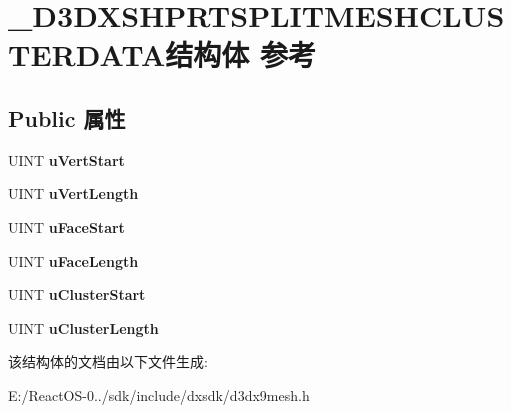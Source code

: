 \hypertarget{struct___d3_d_x_s_h_p_r_t_s_p_l_i_t_m_e_s_h_c_l_u_s_t_e_r_d_a_t_a}{}\section{\+\_\+\+D3\+D\+X\+S\+H\+P\+R\+T\+S\+P\+L\+I\+T\+M\+E\+S\+H\+C\+L\+U\+S\+T\+E\+R\+D\+A\+T\+A结构体 参考}
\label{struct___d3_d_x_s_h_p_r_t_s_p_l_i_t_m_e_s_h_c_l_u_s_t_e_r_d_a_t_a}
\subsection*{Public 属性}
\begin{DoxyCompactItemize}
\item 
\mbox{\label{struct___d3_d_x_s_h_p_r_t_s_p_l_i_t_m_e_s_h_c_l_u_s_t_e_r_d_a_t_a_a236d9789a21dc2db70242b1cb53d2841}} 
U\+I\+NT {\bfseries u\+Vert\+Start}
\item 
\mbox{\label{struct___d3_d_x_s_h_p_r_t_s_p_l_i_t_m_e_s_h_c_l_u_s_t_e_r_d_a_t_a_a23a9623145c342742cd01b0a7da49141}} 
U\+I\+NT {\bfseries u\+Vert\+Length}
\item 
\mbox{\label{struct___d3_d_x_s_h_p_r_t_s_p_l_i_t_m_e_s_h_c_l_u_s_t_e_r_d_a_t_a_a60d82605ede5ca49a9c1e10eb2028607}} 
U\+I\+NT {\bfseries u\+Face\+Start}
\item 
\mbox{\label{struct___d3_d_x_s_h_p_r_t_s_p_l_i_t_m_e_s_h_c_l_u_s_t_e_r_d_a_t_a_a9c040144e404ffba82e05b955fea5c48}} 
U\+I\+NT {\bfseries u\+Face\+Length}
\item 
\mbox{\label{struct___d3_d_x_s_h_p_r_t_s_p_l_i_t_m_e_s_h_c_l_u_s_t_e_r_d_a_t_a_a8186f69be11543cfa6d18e325d60f4f1}} 
U\+I\+NT {\bfseries u\+Cluster\+Start}
\item 
\mbox{\label{struct___d3_d_x_s_h_p_r_t_s_p_l_i_t_m_e_s_h_c_l_u_s_t_e_r_d_a_t_a_aa4e5b0ff163126c13392d78c8c063711}} 
U\+I\+NT {\bfseries u\+Cluster\+Length}
\end{DoxyCompactItemize}


该结构体的文档由以下文件生成\+:\begin{DoxyCompactItemize}
\item 
E\+:/\+React\+O\+S-\/0../sdk/include/dxsdk/d3dx9mesh.\+h\end{DoxyCompactItemize}
